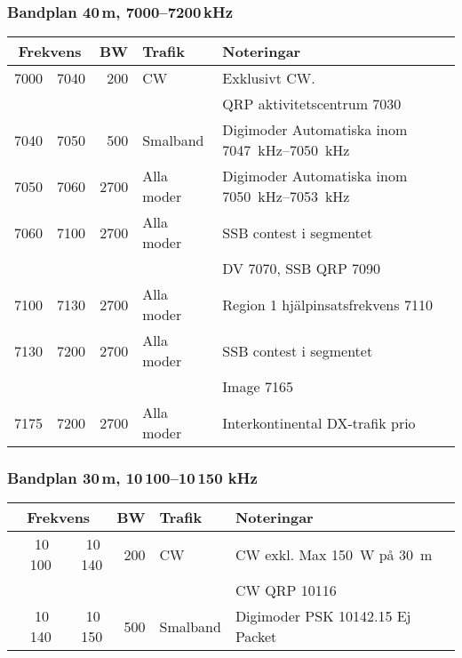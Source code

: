 \subsubsection{Bandplan 40\,m, 7000--7200\,kHz}
\begin{tabular}{rrrll}
\multicolumn{2}{c}{\textbf{Frekvens}} & \textbf{BW} & \textbf{Trafik} & \textbf{Noteringar} \\ \hline

7000 & 7040 & 200  & CW         & Exklusivt CW.                                        \\
     &      &      &            & QRP aktivitetscentrum \SI{7030}{}                    \\ \hline
7040 & 7050 & 500  & Smalband   & Digimoder Automatiska inom \SIrange{7047}{7050}{kHz} \\ \hline
7050 & 7060 & 2700 & Alla moder & Digimoder Automatiska inom \SIrange{7050}{7053}{kHz} \\ \hline
7060 & 7100 & 2700 & Alla moder & SSB contest i segmentet                              \\
     &      &      &            & DV \num{7070}, SSB QRP \num{7090}                    \\ \hline
7100 & 7130 & 2700 & Alla moder & Region 1 hjälpinsatsfrekvens \num{7110}           \\ \hline
7130 & 7200 & 2700 & Alla moder & SSB contest i segmentet                              \\
     &      &      &            & Image \num{7165}                                     \\ \hline
7175 & 7200 & 2700 & Alla moder & Interkontinental DX-trafik prio                      \\ \hline

\end{tabular}
\subsubsection{Bandplan 30\,m, 10\,100--10\,150 kHz}
\begin{tabular}{rrrll}
\multicolumn{2}{c}{\textbf{Frekvens}} & \textbf{BW} & \textbf{Trafik} & \textbf{Noteringar} \\ \hline

10\,100 & 10\,140 & 200 & CW       & CW exkl. Max \SI{150}{W} på \SI{30}{m} \\
        &         &     &          & CW QRP \num{10116}                     \\ \hline
10\,140 & 10\,150 & 500 & Smalband & Digimoder PSK \num{10142,15} Ej Packet \\ \hline
\end{tabular}

